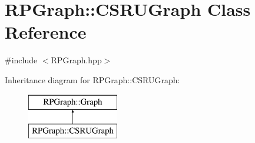 \hypertarget{classRPGraph_1_1CSRUGraph}{}\section{R\+P\+Graph\+:\+:C\+S\+R\+U\+Graph Class Reference}
\label{classRPGraph_1_1CSRUGraph}


{\ttfamily \#include $<$R\+P\+Graph.\+hpp$>$}

Inheritance diagram for R\+P\+Graph\+:\+:C\+S\+R\+U\+Graph\+:\begin{figure}[H]
\begin{center}
\leavevmode
\includegraphics[height=2.000000cm]{classRPGraph_1_1CSRUGraph}
\end{center}
\end{figure}
